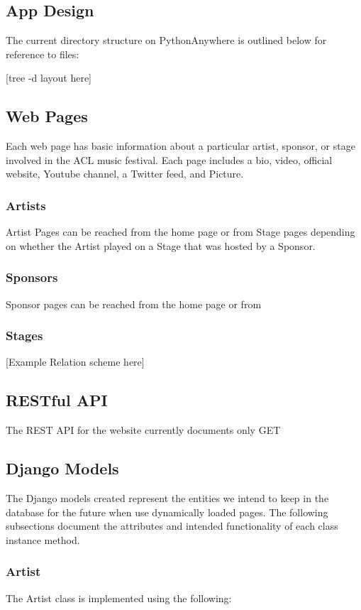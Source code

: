 \documentclass[12pt,english]{article}
\begin{document}
\subsection{App Design}
The current directory structure on PythonAnywhere is outlined below for reference to files:

[tree -d layout here]

\subsection{Web Pages}
Each web page has basic information about a particular artist, sponsor, or stage involved in the ACL music festival.
Each page includes a bio, video, official website, Youtube channel, a Twitter feed, and Picture.
\subsubsection{Artists}
Artist Pages can be reached from the home page or from Stage pages depending on whether the Artist played on
a Stage that was hosted by a Sponsor. 
\subsubsection{Sponsors}
Sponsor pages can be reached from the home page or from 

\subsubsection{Stages}


[Example Relation scheme here]

\subsection{RESTful  API}
The REST API for the website currently documents only GET 

\subsection{Django Models}
The Django models created represent the entities we intend to keep in the database for the future when use dynamically loaded pages.
The following subsections document the attributes and intended functionality of each class instance method.
\subsubsection{Artist}
The Artist class is implemented using the following:
\end{document}
